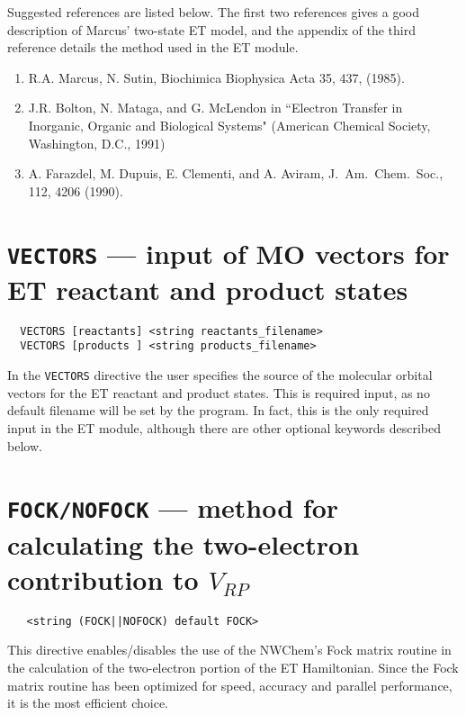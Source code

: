 Suggested references are listed below.  The first two references gives a good description 
of Marcus' two-state ET model, and the appendix of the third reference details the method used
in the ET module.

\begin{enumerate}
\item R.A. Marcus, N. Sutin, Biochimica Biophysica Acta 35, 437, (1985).
\item J.R. Bolton, N. Mataga, and G. McLendon in ``Electron Transfer in Inorganic, Organic and Biological Systems"
(American Chemical Society, Washington, D.C., 1991)
\item A. Farazdel, M. Dupuis, E. Clementi, and A. Aviram, 
J.~Am.~Chem.~Soc., 112, 4206 (1990).
\end{enumerate}

\section{{\tt VECTORS} --- input of MO vectors for ET reactant and product states}
\label{sec:etransvectors}

\begin{verbatim}
  VECTORS [reactants] <string reactants_filename>
  VECTORS [products ] <string products_filename>
\end{verbatim}

In the \verb+VECTORS+ directive the user specifies the source 
of the molecular orbital vectors for the ET reactant and product states. 
This is required input, as no default filename will be set by the program.
In fact, this is the only required input in the ET module, although there are
other optional keywords described below.

\section{{\tt FOCK/NOFOCK} --- method for calculating the two-electron contribution to $V_{RP}$ }
\label{sec:etransfock}

 \begin{verbatim}
   <string (FOCK||NOFOCK) default FOCK>
 \end{verbatim}

This directive enables/disables the use of the NWChem's Fock matrix 
routine in the calculation of the two-electron portion of the ET Hamiltonian.
Since the Fock matrix routine has been optimized for speed, accuracy and parallel performance,
it is the most efficient choice.

